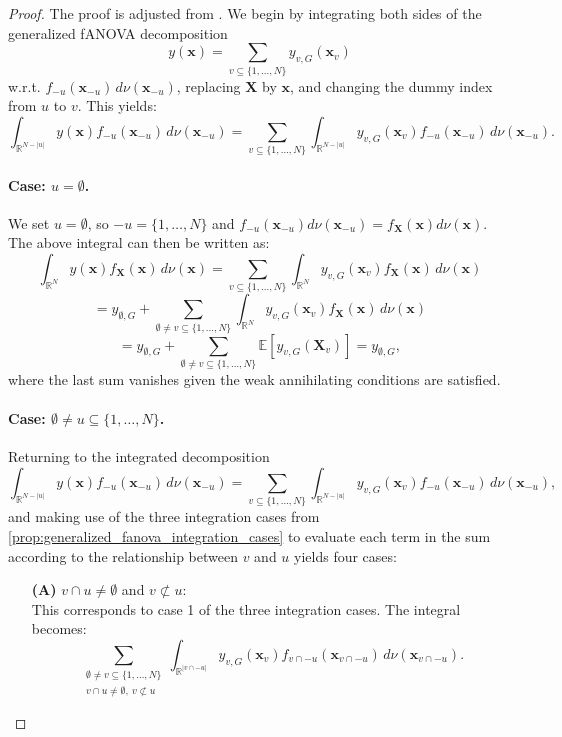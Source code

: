 \begin{proof}
The proof is adjusted from \cite{rahman2014}. We begin by integrating both sides of the generalized fANOVA decomposition
\[
y(\boldsymbol{x}) = \sum_{v \subseteq \{1,\dots,N\}} y_{v,G}(\boldsymbol{x}_v)
\]
w.r.t. $f_{-u}(\boldsymbol{x}_{-u})\, d \nu(\boldsymbol{x}_{-u})$, replacing $\boldsymbol{X}$ by $\boldsymbol{x}$, and changing the dummy index from $u$ to $v$. This yields:
\[
\int_{\mathbb{R}^{N - |u|}} y(\boldsymbol{x}) f_{-u}(\boldsymbol{x}_{-u}) \, d \nu(\boldsymbol{x}_{-u})
= \sum_{v \subseteq \{1,\dots,N\}} \int_{\mathbb{R}^{N - |u|}} y_{v,G}(\boldsymbol{x}_v) f_{-u}(\boldsymbol{x}_{-u}) \, d \nu(\boldsymbol{x}_{-u}).
\]
\paragraph{Case: \( u = \emptyset \).}
We set $u = \emptyset$, so $-u = \{1,\dots,N\}$ and $f_{-u}(\boldsymbol{x}_{-u}) d \nu(\boldsymbol{x}_{-u}) = f_{\boldsymbol{X}}(\boldsymbol{x}) d \nu(\boldsymbol{x})$. The above integral can then be written as:
\[
\int_{\mathbb{R}^N} y(\boldsymbol{x}) f_{\boldsymbol{X}}(\boldsymbol{x}) \, d \nu(\boldsymbol{x})
= \sum_{v \subseteq \{1,\dots,N\}} \int_{\mathbb{R}^N} y_{v,G}(\boldsymbol{x}_v) f_{\boldsymbol{X}}(\boldsymbol{x}) \, d \nu(\boldsymbol{x})
\]
\[
= y_{\emptyset,G}
+ \sum_{\emptyset \ne v \subseteq \{1,\dots,N\}} \int_{\mathbb{R}^N} y_{v,G}(\boldsymbol{x}_v) f_{\boldsymbol{X}}(\boldsymbol{x}) \, d \nu(\boldsymbol{x})
\]
\[
= y_{\emptyset,G} + \sum_{\emptyset \ne v \subseteq \{1,\dots,N\}} \mathbb{E}[y_{v,G}(\boldsymbol{X}_v)] = y_{\emptyset,G},
\]
where the last sum vanishes given the weak annihilating conditions are satisfied.

\paragraph{Case: \( \emptyset \ne u \subseteq \{1,\dots,N\} \).}
Returning to the integrated decomposition
\[
\int_{\mathbb{R}^{N - |u|}} y(\boldsymbol{x}) f_{-u}(\boldsymbol{x}_{-u}) \, d \nu(\boldsymbol{x}_{-u})
= \sum_{v \subseteq \{1,\dots,N\}} \int_{\mathbb{R}^{N - |u|}} y_{v,G}(\boldsymbol{x}_v) f_{-u}(\boldsymbol{x}_{-u}) \, d \nu(\boldsymbol{x}_{-u}),
\]
and making use of the three integration cases from \autoref{prop:generalized_fanova_integration_cases} to evaluate each term in the sum according to the relationship between $v$ and $u$ yields four cases:

\begin{itemize}
  \item[\textbf{(A)}] \( v \cap u \ne \emptyset \) and \( v \not\subset u \): \\
  This corresponds to case 1 of the three integration cases. The integral becomes:
  \[
  \sum_{\substack{\emptyset \ne v \subseteq \{1,\dots,N\} \\ v \cap u \ne \emptyset,\ v \not\subset u}} 
  \int_{\mathbb{R}^{|v \cap -u|}} y_{v,G}(\boldsymbol{x}_v) f_{v \cap -u}(\boldsymbol{x}_{v \cap -u}) \, d \nu(\boldsymbol{x}_{v \cap -u}).
  \]


\end{itemize}
\end{proof}

